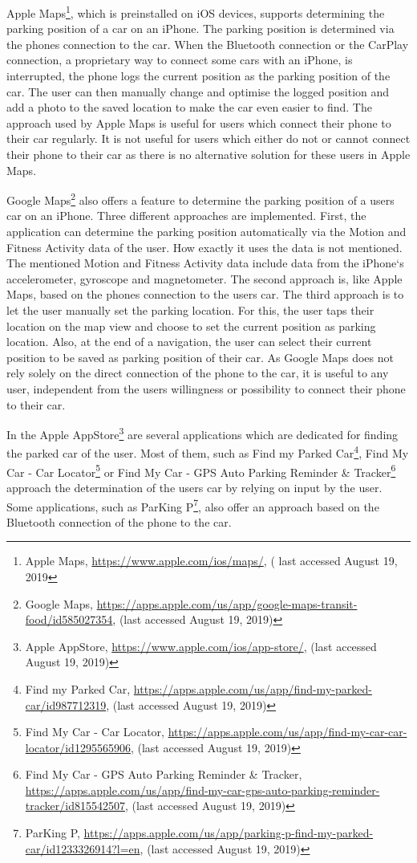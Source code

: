 Apple Maps\footnote{Apple Maps, \url{https://www.apple.com/ios/maps/}, ( last accessed  August 19, 2019}, which is preinstalled on iOS devices, supports determining the parking position of a car on an iPhone.  The parking position is determined via the phones connection to the car. When the Bluetooth connection or the CarPlay connection, a proprietary way to connect some cars with an iPhone, is interrupted, the phone logs the current position as the parking position of the car. The user can then manually change and optimise the logged position and add a photo to the saved location to make the car even easier to find. The approach used by Apple Maps is useful for users which connect their phone to their car regularly. It is not useful for users which either do not or cannot connect their phone to their car as there is no alternative solution for these users in Apple Maps. \cite{apple:maps:parkedcar}

Google Maps\footnote{Google Maps, \url{https://apps.apple.com/us/app/google-maps-transit-food/id585027354}, (last accessed August 19, 2019)} also offers a feature to determine the parking position of a users car on an iPhone. Three different approaches are implemented. First,  the application can determine the parking position automatically via the Motion and Fitness Activity data of the user. How exactly it uses the data is not mentioned. The mentioned Motion and Fitness Activity data include data from the iPhone`s accelerometer, gyroscope and magnetometer. The second approach is, like Apple Maps, based on the phones connection to the users car. The third approach is to let the user manually set the parking location. For this, the user taps their location on the map view and choose to set the current position as parking location. Also, at the end of a navigation, the user can select their current position to be saved as parking position of their car. As Google Maps does not rely solely on the direct connection of the phone to the car, it is useful to any user, independent from the users willingness or possibility to connect their phone to their car. \cite{google:maps:app:parkedcar}  \cite{apple:CoreMotion}

In the Apple AppStore\footnote{Apple AppStore, \url{https://www.apple.com/ios/app-store/}, (last accessed August 19, 2019)} are several applications which are dedicated for finding the parked car of the user. Most of them, such as Find my Parked Car\footnote{Find my Parked Car, \url{https://apps.apple.com/us/app/find-my-parked-car/id987712319}, (last accessed August 19, 2019)}, Find My Car - Car Locator\footnote{Find My Car - Car Locator, \url{https://apps.apple.com/us/app/find-my-car-car-locator/id1295565906}, (last accessed August 19, 2019)} or Find My Car - GPS Auto Parking Reminder \& Tracker\footnote{Find My Car - GPS Auto Parking Reminder \& Tracker, \url{https://apps.apple.com/us/app/find-my-car-gps-auto-parking-reminder-tracker/id815542507}, (last accessed August 19, 2019)} approach the determination of the users car by relying on input by the user. Some applications, such as ParKing P\footnote{ParKing P, \url{https://apps.apple.com/us/app/parking-p-find-my-parked-car/id1233326914?l=en}, (last accessed August 19, 2019)}, also offer an approach based on the Bluetooth connection of the phone to the car. 

